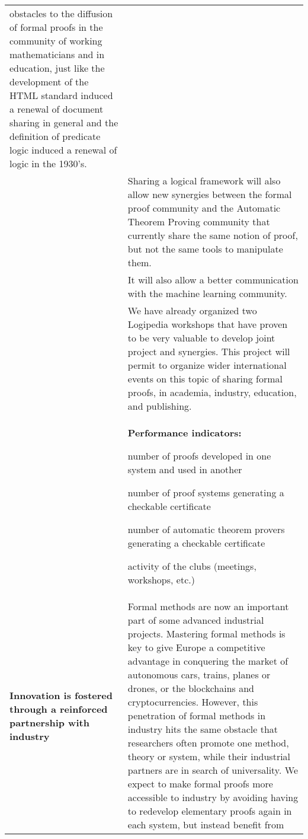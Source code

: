 \begin{longtable}{|p{}|p{}|}
obstacles to the diffusion of formal proofs in the community of
working mathematicians and in education, just like the development
of the HTML standard induced a renewal of document sharing in general
and the definition of predicate logic induced a renewal of logic in
the 1930's.\\
&
\hspace{0.4cm}
Sharing a logical framework will also allow new synergies between the
formal proof community and the Automatic Theorem Proving community
that currently share the same notion of proof, but not the same tools
to manipulate them.
\\
&
\hspace{0.4cm}
It will also allow a better communication with the machine learning community.\\
&
\hspace{0.4cm}
We have already organized two Logipedia workshops that have proven to
be very valuable to develop joint project and synergies.  This project
will permit to organize wider international events on this topic of
sharing formal proofs, in academia, industry, education, and
publishing.\\
&
\colorbox{color3}{\bf Performance indicators:}
\begin{compactitem}
  \item number of proofs developed in one system and used in another
  \item number of proof systems generating a checkable certificate
  \item number of automatic theorem provers generating a checkable certificate 
  \item activity of the clubs (meetings, workshops, etc.)
\end{compactitem}
\\
\hline
{\bf Innovation is fostered through a reinforced partnership
with industry}
&
Formal methods are now an important part of some advanced industrial
projects. Mastering formal methods is key to give Europe a competitive
advantage in conquering the market of autonomous cars, trains, planes
or drones, or the blockchains and cryptocurrencies. However, this
penetration of formal methods in industry hits the same obstacle that
researchers often promote one method, theory or system, while their
industrial partners are in search of universality. We expect to make
formal proofs more accessible to industry by avoiding having to redevelop
elementary proofs again in each system, but instead benefit from

\end{longtable}
